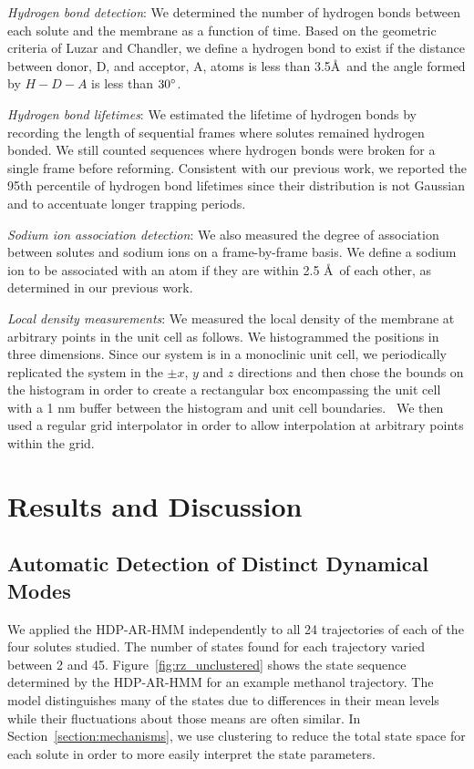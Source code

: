 \documentclass[journal=jpcbfk,manuscript=article]{achemso}
\begin{document}
  \textit{Hydrogen bond detection}: We determined the number of hydrogen bonds 
  between each solute and the membrane as a function of time. Based on the 
  geometric criteria of Luzar and Chandler, we define a hydrogen bond to exist 
  if the distance between donor, D, and acceptor, A, atoms is less than 
  3.5\AA~and the angle formed by $H-D-A$ is less than $30\degree$.~\cite{luzar_effect_1996}
  
  \textit{Hydrogen bond lifetimes}: We estimated the lifetime of hydrogen bonds by 
  recording the length of sequential frames where solutes remained hydrogen bonded.
  We still counted sequences where hydrogen bonds were broken for a single frame 
  before reforming. Consistent with our previous work, we reported the 95th 
  percentile of hydrogen bond lifetimes since their distribution is not Gaussian
  and to accentuate longer trapping periods.~\cite{coscia_chemically_2019}
  
  \textit{Sodium ion association detection}: We also measured the degree of association
  between solutes and sodium ions on a frame-by-frame basis. We define a sodium ion to
  be associated with an atom if they are within 2.5 \AA~of each other, as determined 
  in our previous work.~\cite{coscia_chemically_2019}
  
  \textit{Local density measurements}: We measured the local density of the membrane at
  arbitrary points in the unit cell as follows. We histogrammed the positions in three 
  dimensions. Since our system is in a monoclinic unit cell, we periodically replicated
  the system in the $\pm x$, $y$ and $z$ directions and then chose the bounds on the
  histogram in order to create a rectangular box encompassing the unit cell with
  a 1 nm buffer between the histogram and unit cell boundaries.~\cite{van_der_walt_numpy_2011}
  We then used a regular grid interpolator in order to allow interpolation at arbitrary
  points within the grid.~\cite{virtanen_scipy_2020} 

  \section{Results and Discussion}
  
  \subsection{Automatic Detection of Distinct Dynamical Modes}\label{section:find_modes}
  
  We applied the HDP-AR-HMM independently to all 24 trajectories of each of the four solutes studied.
  The number of states found for each trajectory varied between 2 and 45.
  Figure~\ref{fig:rz_unclustered} shows the state sequence determined by the HDP-AR-HMM for
  an example methanol trajectory. The model distinguishes many of the states due to 
  differences in their mean levels while their fluctuations about those means are often 
  similar. In Section~\ref{section:mechanisms}, we use clustering to reduce the total state
  space for each solute in order to more easily interpret the state parameters.
  
\end{document}
